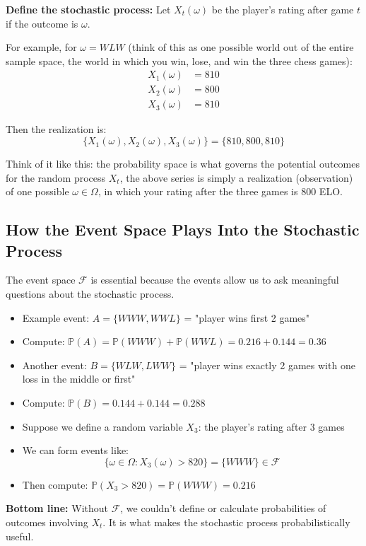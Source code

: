 \documentclass[10pt]{article}
\begin{document}
	\textbf{Define the stochastic process:} Let \( X_t(\omega) \) be the player's rating after game \( t \) if the outcome is \( \omega \).
	
	For example, for \( \omega = WLW \) (think of this as one possible world out of the entire sample space, the world in which you win, lose, and win the three chess games):
	\begin{align*}
		X_1(\omega) &= 810 \\
		X_2(\omega) &= 800 \\
		X_3(\omega) &= 810
	\end{align*}
	
	Then the realization is:
	\[
	\{X_1(\omega), X_2(\omega), X_3(\omega)\} = \{810, 800, 810\}
	\]
	
	Think of it like this: the probability space is what governs the potential outcomes for the random process $X_t$, the above series is simply a realization (observation) of one possible $\omega \in \Omega$, in which your rating after the three games is 800 ELO.
	
	\subsection*{How the Event Space Plays Into the Stochastic Process}
	The event space \( \mathcal{F} \) is essential because the events allow us to ask meaningful questions about the stochastic process.
	
	\begin{itemize}
		\item Example event: \( A = \{WWW, WWL\} \) = "player wins first 2 games"
		\item Compute: \( \mathbb{P}(A) = \mathbb{P}(WWW) + \mathbb{P}(WWL) = 0.216 + 0.144 = 0.36 \) 
		\item Another event: \( B = \{WLW, LWW\} \) = "player wins exactly 2 games with one loss in the middle or first" 
		\item Compute: \( \mathbb{P}(B) = 0.144 + 0.144 = 0.288 \)
		\item Suppose we define a random variable \( X_3 \): the player's rating after 3 games
		\item We can form events like:
		\[ \{\omega \in \Omega : X_3(\omega) > 820\} = \{WWW\} \in \mathcal{F} \]
		\item Then compute: \( \mathbb{P}(X_3 > 820) = \mathbb{P}(WWW) = 0.216 \)
	\end{itemize}
	
	\textbf{Bottom line:} Without \( \mathcal{F} \), we couldn’t define or calculate probabilities of outcomes involving \( X_t \). It is what makes the stochastic process probabilistically useful.
	
\end{document}
